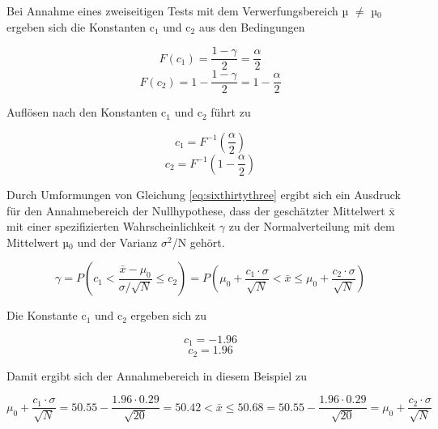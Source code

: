 \noindent Bei Annahme eines zweiseitigen Tests mit dem Verwerfungsbereich µ $\neq$ µ$_{0}$ ergeben sich die Konstanten c$_{1}$ und c$_{2}$ aus den Bedingungen

\begin{equation}\label{eq:sixthirtyfour}
F(c_{1})=\dfrac{1-\gamma}{2} =\dfrac{\alpha}{2}
\end{equation}
\begin{equation}\label{eq:sixthirtyfive}
F(c_{2})=1-\dfrac{1-\gamma}{2} =1-\dfrac{\alpha}{2}
\end{equation}

\noindent Aufl\"{o}sen nach den Konstanten c$_{1}$ und c$_{2}$ f\"{u}hrt zu

\begin{equation}\label{eq:sixthirtysix}
c_{1} =F^{-1} \left(\dfrac{\alpha }{2} \right)
\end{equation}
\begin{equation}\label{eq:sixthirtyseven}
c_{2} =F^{-1} \left(1-\dfrac{\alpha }{2} \right)
\end{equation}

\noindent Durch Umformungen von Gleichung \eqref{eq:sixthirtythree} ergibt sich ein Ausdruck f\"{u}r den Annahmebereich der Nullhypothese, dass der gesch\"{a}tzter Mittelwert $\overline{\mathrm{x}}$ mit einer spezifizierten Wahrscheinlichkeit $\gamma$ zu der Normalverteilung mit dem Mittelwert µ$_{0}$ und der Varianz $\sigma^{2}$/N geh\"{o}rt.

\begin{equation}\label{eq:sixthirtyeight}
\gamma =P\left(c_{1} <\dfrac{\bar{x}-\mu _{0}}{\sigma /\sqrt{N}} \le c_{2} \right)=P\left(\mu _{0} +\dfrac{c_{1} \cdot \sigma }{\sqrt{N}} <\bar{x}\le \mu _{0} +\dfrac{c_{2} \cdot \sigma }{\sqrt{N}} \right)
\end{equation}

\noindent Die Konstante c$_{1}$ und c$_{2}$ ergeben sich zu

\begin{equation}\label{eq:sixthirtynine}
c_{1} =-1.96
\end{equation}
\begin{equation}\label{eq:sixfourty}
c_{2} =1.96
\end{equation}

\noindent Damit ergibt sich der Annahmebereich in diesem Beispiel zu

\begin{equation}\label{eq:sixfourtyone}
\mu _{0} +\dfrac{c_{1} \cdot \sigma }{\sqrt{N}} = 50.55-\dfrac{1.96\cdot 0.29}{\sqrt{20}} =50.42<\bar{x}\le 50.68= 50.55-\dfrac{1.96\cdot 0.29}{\sqrt{20}} =\mu _{0} +\dfrac{c_{2} \cdot \sigma}{\sqrt{N}}
\end{equation}


